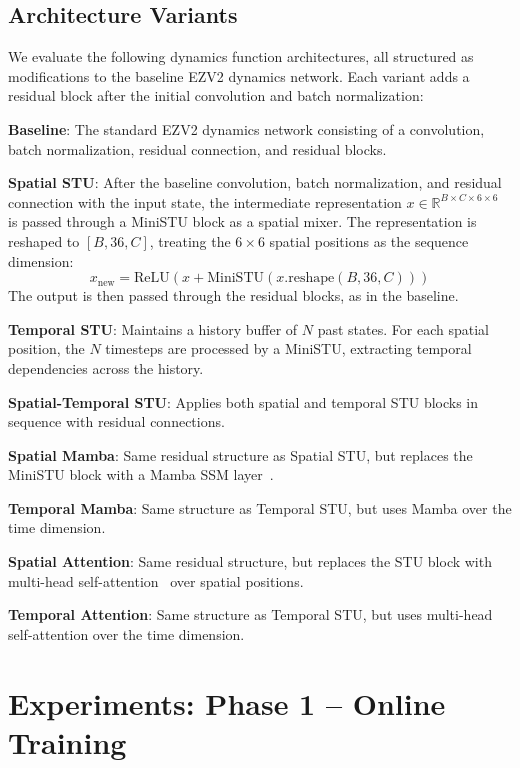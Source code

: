 \documentclass[10pt,twocolumn]{IEEEtran}
\begin{document}
\subsection{Architecture Variants}
\label{sec:arch-variants}

We evaluate the following dynamics function architectures, all structured as modifications to the baseline EZV2 dynamics network. Each variant adds a residual block after the initial convolution and batch normalization:

\textbf{Baseline}: The standard EZV2 dynamics network consisting of a convolution, batch normalization, residual connection, and residual blocks.

\textbf{Spatial STU}: After the baseline convolution, batch normalization, and residual connection with the input state, the intermediate representation $x \in \mathbb{R}^{B \times C \times 6 \times 6}$ is passed through a MiniSTU block as a spatial mixer. The representation is reshaped to $[B, 36, C]$, treating the $6 \times 6$ spatial positions as the sequence dimension:
\begin{equation}
x_{\text{new}} = \text{ReLU}(x + \text{MiniSTU}(x.\text{reshape}(B, 36, C)))
\end{equation}
The output is then passed through the residual blocks, as in the baseline.

\textbf{Temporal STU}: Maintains a history buffer of $N$ past states. For each spatial position, the $N$ timesteps are processed by a MiniSTU, extracting temporal dependencies across the history.

\textbf{Spatial-Temporal STU}: Applies both spatial and temporal STU blocks in sequence with residual connections.

\textbf{Spatial Mamba}: Same residual structure as Spatial STU, but replaces the MiniSTU block with a Mamba SSM layer~\cite{gu2024mamba}.

\textbf{Temporal Mamba}: Same structure as Temporal STU, but uses Mamba over the time dimension.

\textbf{Spatial Attention}: Same residual structure, but replaces the STU block with multi-head self-attention~\cite{vaswani2017attention} over spatial positions.

\textbf{Temporal Attention}: Same structure as Temporal STU, but uses multi-head self-attention over the time dimension.

\section{Experiments: Phase 1  --  Online Training}
\label{sec:online}
\end{document}
